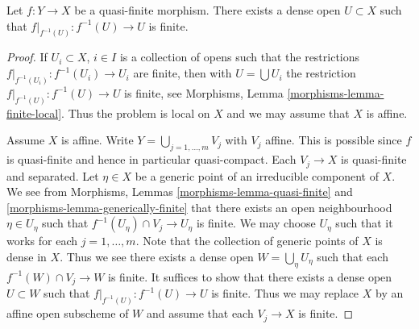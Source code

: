 \begin{lemma}
\label{lemma-quasi-finite-finite-over-dense-open}
Let $f : Y \to X$ be a quasi-finite morphism.
There exists a dense open $U \subset X$ such that
$f|_{f^{-1}(U)} : f^{-1}(U) \to U$ is finite.
\end{lemma}

\begin{proof}
If $U_i \subset X$, $i \in I$ is a collection of opens such that the
restrictions $f|_{f^{-1}(U_i)} : f^{-1}(U_i) \to U_i$ are finite,
then with $U = \bigcup U_i$ the restriction $f|_{f^{-1}(U)} : f^{-1}(U) \to U$
is finite, see
Morphisms, Lemma \ref{morphisms-lemma-finite-local}.
Thus the problem is local on $X$ and we may assume that $X$ is affine.

\medskip\noindent
Assume $X$ is affine.
Write $Y = \bigcup_{j = 1, \ldots, m} V_j$ with $V_j$ affine.
This is possible since $f$ is quasi-finite and hence
in particular quasi-compact. Each $V_j \to X$ is quasi-finite
and separated. Let $\eta \in X$ be a generic point of an irreducible
component of $X$. We see from
Morphisms, Lemmas
\ref{morphisms-lemma-quasi-finite} and \ref{morphisms-lemma-generically-finite}
that there exists an open neighbourhood $\eta \in U_\eta$ such that
$f^{-1}(U_\eta) \cap V_j \to U_\eta$ is finite. We may choose $U_\eta$ such
that it works for each $j = 1, \ldots, m$.
Note that the collection of generic points of $X$ is dense in $X$.
Thus we see there exists a dense open $W = \bigcup_\eta U_\eta$
such that each $f^{-1}(W) \cap V_j \to W$ is finite.
It suffices to show that there exists a dense open $U \subset W$
such that $f|_{f^{-1}(U)} : f^{-1}(U) \to U$ is finite.
Thus we may replace $X$ by an affine open subscheme of $W$ and
assume that each $V_j \to X$ is finite.


\end{proof}
